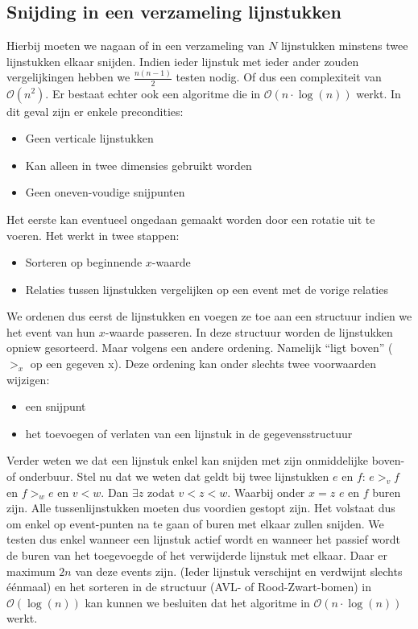 \documentclass[a4paper,titlepage]{article}
\newcommand{\brak}[1]{\left(#1\right)}
\newcommand{\bigoh}[1]{\ensuremath{\mathcal{O}\left(#1\right)}}
\begin{document}
\subsection{Snijding in een verzameling lijnstukken}
Hierbij moeten we nagaan of in een verzameling van $N$ lijnstukken minstens twee lijnstukken elkaar snijden. Indien ieder lijnstuk met ieder ander zouden vergelijkingen hebben we $\frac{n\brak{n-1}}{2}$ testen nodig. Of dus een complexiteit van \bigoh{n^2}. Er bestaat echter ook een algoritme die in \bigoh{n\cdot\log\brak{n}} werkt. In dit geval zijn er enkele precondities:
\begin{itemize}
 \item Geen verticale lijnstukken
 \item Kan alleen in twee dimensies gebruikt worden
 \item Geen oneven-voudige snijpunten
\end{itemize}
Het eerste kan eventueel ongedaan gemaakt worden door een rotatie uit te voeren.
Het werkt in twee stappen:
\begin{itemize}
 \item Sorteren op beginnende $x$-waarde
 \item Relaties tussen lijnstukken vergelijken op een event met de vorige relaties
\end{itemize}
We ordenen dus eerst de lijnstukken en voegen ze toe aan een structuur indien we het event van hun $x$-waarde passeren. In deze structuur worden de lijnstukken opniew gesorteerd. Maar volgens een andere ordening. Namelijk ``ligt boven'' ($>_x$ op een gegeven x). Deze ordening kan onder slechts twee voorwaarden wijzigen:
\begin{itemize}
 \item een snijpunt
 \item het toevoegen of verlaten van een lijnstuk in de gegevensstructuur
\end{itemize}
Verder weten we dat een lijnstuk enkel kan snijden met zijn onmiddelijke boven- of onderbuur. Stel nu dat we weten dat geldt bij twee lijnstukken $e$ en $f$: $e>_vf$ en $f>_we$ en $v<w$. Dan $\exists z$ zodat $v<z<w$. Waarbij onder $x=z$ $e$ en $f$ buren zijn. Alle tussenlijnstukken moeten dus voordien gestopt zijn. Het volstaat dus om enkel op event-punten na te gaan of buren met elkaar zullen snijden. We testen dus enkel wanneer een lijnstuk actief wordt en wanneer het passief wordt de buren van het toegevoegde of het verwijderde lijnstuk met elkaar. Daar er maximum $2n$ van deze events zijn. (Ieder lijnstuk verschijnt en verdwijnt slechts \'e\'enmaal) en het sorteren in de structuur (AVL- of Rood-Zwart-bomen) in \bigoh{\log\brak{n}} kan kunnen we besluiten dat het algoritme in \bigoh{n\cdot\log\brak{n}} werkt.
\newpage
\end{document}

